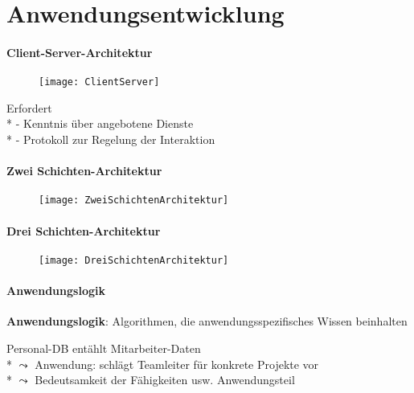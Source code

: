 \section{Anwendungsentwicklung}
\label{sec:anwendungeentwicklung}

\paragraph{Client-Server-Architektur}
\begin{figure}[H]\centering\label{ClientServer}\texttt{[image: ClientServer]}\end{figure}
\begin{items}
	\item Erfordert \\*
		- Kenntnis über angebotene Dienste \\*
		- Protokoll zur Regelung der Interaktion
\end{items}

\paragraph{Zwei Schichten-Architektur}
\begin{figure}[H]\centering\label{ZweiSchichtenArchitektur}\texttt{[image: ZweiSchichtenArchitektur]}\end{figure}

\paragraph{Drei Schichten-Architektur}
\begin{figure}[H]\centering\label{DreiSchichtenArchitektur}\texttt{[image: DreiSchichtenArchitektur]}\end{figure}

\paragraph{Anwendungslogik}
\begin{items}
	\item \textbf{Anwendungslogik}: Algorithmen, die anwendungsspezifisches Wissen beinhalten
	\item Personal-DB entählt Mitarbeiter-Daten
		\\*
		\( \leadsto \) Anwendung: schlägt Teamleiter für konkrete Projekte vor
		\\*
		\( \leadsto \) Bedeutsamkeit der Fähigkeiten usw. Anwendungsteil
\end{items}

